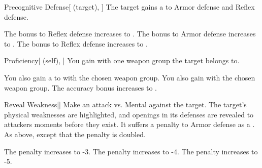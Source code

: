 \lowercase{\hypertarget{spell:Precognitive Defense}{}}\label{spell:Precognitive Defense}
\begin{attuneability}[Rank 1]{\hypertarget{spell:Precognitive Defense}{Precognitive Defense}}[ (target), ]
The target gains a   to Armor defense and Reflex defense.

\rankline
{} The bonus to Reflex defense increases to .
 The bonus to Armor defense increases to .
 The bonus to Reflex defense increases to .
\end{attuneability}
\vspace{0.25em}



\lowercase{\hypertarget{spell:Proficiency}{}}\label{spell:Proficiency}
\begin{attuneability}[Rank 1]{\hypertarget{spell:Proficiency}{Proficiency}}[ (self), ]
You gain  with one weapon group the target belongs to.

\rankline
{} You also gain a   to  with the chosen weapon group.
 You also gain  with the chosen weapon group.
 The accuracy bonus increases to .
\end{attuneability}
\vspace{0.25em}



\lowercase{\hypertarget{spell:Reveal Weakness}{}}\label{spell:Reveal Weakness}
\begin{freeability}[Rank 1]{\hypertarget{spell:Reveal Weakness}{Reveal Weakness}}[]
Make an attack vs. Mental against the target.
\hit The target's physical weaknesses are highlighted, and openings in its defenses are revealed to attackers moments before they exist.
It suffers a  penalty to Armor defense as a .
\crit As above, except that the penalty is doubled.

\rankline
{} The penalty increases to -3.
 The penalty increases to -4.
 The penalty increases to -5.
\end{freeability}
\vspace{0.25em}



